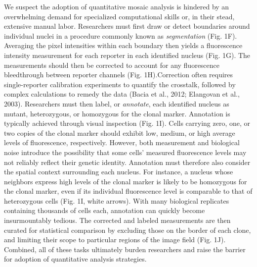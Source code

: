 We suspect the adoption of quantitative mosaic analysis is hindered by an overwhelming demand for specialized computational skills or, in their stead, extensive manual labor. Researchers must first draw or detect boundaries around individual nuclei in a procedure commonly known as \emph{segmentation} (Fig. 1F). Averaging the pixel intensities within each boundary then yields a fluorescence intensity measurement for each reporter in each identified nucleus (Fig. 1G). The measurements should then be corrected to account for any fluorescence bleedthrough between reporter channels (Fig. 1H).Correction often requires single-reporter calibration experiments to quantify the crosstalk, followed by complex calculations to remedy the data (Bacia et al., 2012; Elangovan et al., 2003). Researchers must then label, or \emph{annotate}, each identified nucleus as mutant, heterozygous, or homozygous for the clonal marker. Annotation is typically achieved through visual inspection (Fig. 1I). Cells carrying zero, one, or two copies of the clonal marker should exhibit low, medium, or high average levels of fluorescence, respectively. However, both measurement and biological noise introduce the possibility that some cells' measured fluorescence levels may not reliably reflect their genetic identity. Annotation must therefore also consider the spatial context surrounding each nucleus. For instance, a nucleus whose neighbors express high levels of the clonal marker is likely to be homozygous for the clonal marker, even if its individual fluorescence level is comparable to that of heterozygous cells (Fig. 1I, white arrows). With many biological replicates containing thousands of cells each, annotation can quickly become insurmountably tedious. The corrected and labeled measurements are then curated for statistical comparison by excluding those on the border of each clone, and limiting their scope to particular regions of the image field (Fig. 1J). Combined, all of these tasks ultimately burden researchers and raise the barrier for adoption of quantitative analysis strategies.

